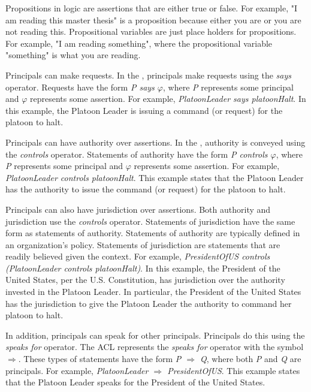 \documentclass[../../main/main.tex]{subfiles}
\begin{document}
Propositions in logic are assertions that are either true or false.  For example, "I am reading this master thesis" is a proposition because either you are or you are not reading this.  Propositional variables are just place holders for propositions.  For example, "I am reading something", where the propositional variable "something" is what you are reading.

Principals can make requests.  In the , principals make requests using the \textit{says} operator.  Requests have the form \textit{P says $\varphi$},  where \textit{P} represents some principal and \textit{$\varphi$} represents some assertion.  For example, \textit{PlatoonLeader says platoonHalt}.  In this example, the Platoon Leader is issuing a command (or request) for the platoon to halt.  

Principals can have authority over assertions.  In the , authority is conveyed using the \textit{controls} operator.  Statements of authority have the form \textit{P controls $\varphi$},  where \textit{P} represents some principal and \textit{$\varphi$} represents some assertion.  For example, \textit{PlatoonLeader controls platoonHalt}.  This example states that the Platoon Leader has the authority to issue the command (or request) for the platoon to halt. 

Principals can also have jurisdiction over assertions.  Both authority and jurisdiction use the \textit{controls} operator.  Statements of jurisdiction have the same form as statements of authority.  Statements of authority are typically defined in an organization's policy.  Statements of jurisdiction are statements that are readily believed given the context.  For example, \textit{PresidentOfUS controls (PlatoonLeader controls platoonHalt)}.  In this example, the President of the United States, per the U.S. Constitution, has jurisdiction over the authority invested in the Platoon Leader.  In particular, the President of the United States has the jurisdiction to give the Platoon Leader the authority to command her platoon to halt.

In addition, principals can speak for other principals.  Principals do this using the \textit{speaks for} operator.  The ACL represents the \textit{speaks for} operator with the symbol $\Rightarrow$.  These types of statements have the form \textit{P $\Rightarrow$ Q}, where both \textit{P} and \textit{Q} are principals.  For example, \textit{PlatoonLeader $\Rightarrow$ PresidentOfUS}.  This example states that the Platoon Leader speaks for the President of the United States.  
\end{document}
